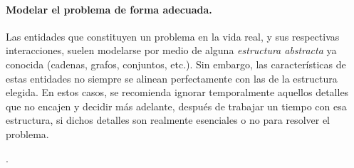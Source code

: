 \paragraph{Modelar el problema de forma adecuada.}
  Las entidades que constituyen un problema en la vida real, y sus respectivas interacciones, suelen modelarse por medio de alguna \emph{estructura abstracta} ya conocida (cadenas, grafos, conjuntos, etc.).
  Sin embargo, las características de estas entidades no siempre se alinean perfectamente con las de la estructura elegida.
  En estos casos, se recomienda ignorar temporalmente aquellos detalles que no encajen y decidir más adelante, después de trabajar un tiempo con esa estructura, si dichos detalles son realmente esenciales o no para resolver el problema.

.
